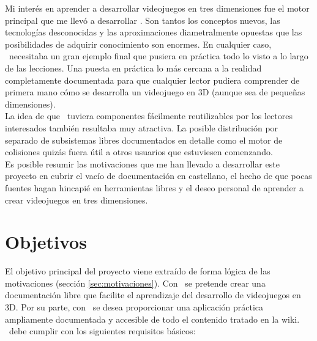 Mi interés en aprender a desarrollar videojuegos en tres dimensiones fue el
motor principal que me llevó a desarrollar \juego. Son tantos los conceptos
nuevos, las tecnologías desconocidas y las aproximaciones diametralmente
opuestas que las posibilidades de adquirir conocimiento son enormes. En cualquier
caso, \wiki\ necesitaba un gran ejemplo final que pusiera en práctica todo
lo visto a lo largo de las lecciones. Una puesta en práctica lo más cercana
a la realidad completamente documentada para que cualquier lector pudiera
comprender de primera mano cómo se desarrolla un videojuego en 3D (aunque
sea de pequeñas dimensiones).\\

La idea de que \juego\ tuviera componentes fácilmente reutilizables por
los lectores interesados también resultaba muy atractiva. La posible
distribución por separado de subsistemas libres documentados en detalle
como el motor de colisiones quizás fuera útil a otros usuarios que
estuviesen comenzando.\\

Es posible resumir las motivaciones que me han llevado a desarrollar este
proyecto en cubrir el vacío de documentación en castellano, el hecho de que
pocas fuentes hagan hincapié en herramientas libres y el deseo personal
de aprender a crear videojuegos en tres dimensiones.\\


\section{Objetivos}
\label{sec:objetivos}

El objetivo principal del proyecto viene extraído de forma lógica de las
motivaciones (sección \ref{sec:motivaciones}). Con \wiki\ se pretende
crear una documentación libre que facilite el aprendizaje del desarrollo
de videojuegos en 3D. Por su parte, con \juego\ se desea proporcionar una 
aplicación práctica ampliamente documentada y accesible de todo el contenido
tratado en la wiki.\\

\wiki\ debe cumplir con los siguientes requisitos básicos:

